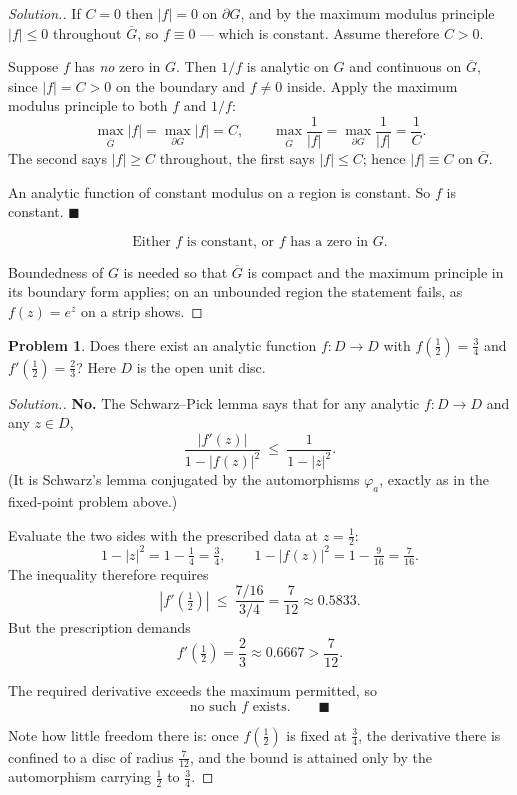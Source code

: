 \documentclass[11pt,a4paper]{article}
\theoremstyle{definition}
\newtheorem{problemx}{Problem}[section]
\newenvironment{problem}{\begin{problemx}}{\end{problemx}}
\newenvironment{solution}
  {\renewcommand{\qedsymbol}{}\begin{proof}[\textit{Solution}.]}
  {\end{proof}}
\begin{document}
\begin{solution}
If $C = 0$ then $\left|f\right| = 0$ on $\partial G$, and by the maximum modulus
principle $\left|f\right| \leq 0$ throughout $\overline{G}$, so $f \equiv 0$ ---
which is constant. Assume therefore $C > 0$.

Suppose $f$ has \emph{no} zero in $G$. Then $1/f$ is analytic on $G$ and continuous
on $\overline{G}$, since $\left|f\right| = C > 0$ on the boundary and $f \neq 0$
inside. Apply the maximum modulus principle to both $f$ and $1/f$:
$$\max_{\overline{G}}\left|f\right| = \max_{\partial G}\left|f\right| = C,
\qquad
\max_{\overline{G}}\frac{1}{\left|f\right|} = \max_{\partial G}\frac{1}{\left|f\right|}
= \frac{1}{C}.$$
The second says $\left|f\right| \geq C$ throughout, the first says
$\left|f\right| \leq C$; hence $\left|f\right| \equiv C$ on $\overline{G}$.

An analytic function of constant modulus on a region is constant. So $f$ is
constant. $\blacksquare$

$$\boxed{\text{Either } f \text{ is constant, or } f \text{ has a zero in } G .}$$

Boundedness of $G$ is needed so that $\overline{G}$ is compact and the maximum
principle in its boundary form applies; on an unbounded region the statement fails,
as $f(z) = e^{z}$ on a strip shows.
\end{solution}


\begin{problem}
Does there exist an analytic function $f : D \rightarrow D$ with
$f\left(\tfrac{1}{2}\right) = \tfrac{3}{4}$ and
$f'\left(\tfrac{1}{2}\right) = \tfrac{2}{3}$? Here $D$ is the open unit disc.
\end{problem}

\begin{solution}
\textbf{No.} The Schwarz--Pick lemma says that for any analytic
$f : D \rightarrow D$ and any $z \in D$,
$$\frac{\left|f'(z)\right|}{1-\left|f(z)\right|^{2}}
\ \leq\ \frac{1}{1-\left|z\right|^{2}} .$$
(It is Schwarz's lemma conjugated by the automorphisms $\varphi_a$, exactly as in
the fixed-point problem above.)

Evaluate the two sides with the prescribed data at $z = \tfrac12$:
$$1 - \left|z\right|^{2} = 1 - \tfrac14 = \tfrac34,
\qquad
1 - \left|f(z)\right|^{2} = 1 - \tfrac{9}{16} = \tfrac{7}{16}.$$
The inequality therefore requires
$$\left|f'\!\left(\tfrac12\right)\right|
\ \leq\ \frac{7/16}{3/4} = \frac{7}{12} \approx 0.5833 .$$
But the prescription demands
$$f'\!\left(\tfrac12\right) = \frac{2}{3} \approx 0.6667 > \frac{7}{12}.$$

The required derivative exceeds the maximum permitted, so
$$\boxed{\text{no such } f \text{ exists.}} \qquad \blacksquare$$

Note how little freedom there is: once $f(\frac12)$ is fixed at $\frac34$, the
derivative there is confined to a disc of radius $\frac7{12}$, and the bound is
attained only by the automorphism carrying $\frac12$ to $\frac34$.
\end{solution}
\end{document}
